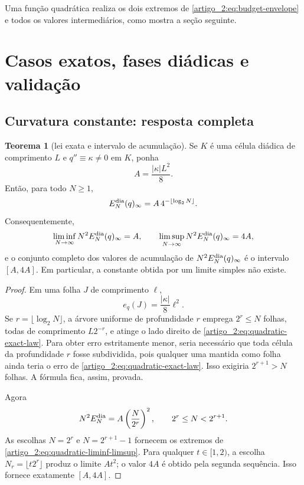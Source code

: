 \documentclass[12pt,a4paper]{article}
\theoremstyle{preciso}
\theoremstyle{definition}
\theoremstyle{preciso}
\newtheorem{theorem}[teorema]{Teorema}
\theoremstyle{preciso}
\theoremstyle{preciso}
\theoremstyle{preciso}
\theoremstyle{definition}
\theoremstyle{preciso}
\theoremstyle{definition}
\theoremstyle{preciso}
\theoremstyle{preciso}
\theoremstyle{definition}
\begin{document}
Uma função quadrática realiza os dois extremos de \eqref{artigo_2:eq:budget-envelope} e todos os valores intermediários, como mostra a seção seguinte.

\section{Casos exatos, fases diádicas e validação}
\label{artigo_2:sec:dyadic-exact-cases}

\subsection{Curvatura constante: resposta completa}

\begin{theorem}[lei exata e intervalo de acumulação]\label{map:artigo_2:12.1}
\label{artigo_2:thm:quadratic-dyadic-constant}
Se $K$ é uma célula diádica de comprimento $L$ e
$q''\equiv\kappa\ne0$ em $K$, ponha
\begin{equation}
 A=\frac{|\kappa|L^2}{8}.
 \label{artigo_2:eq:quadratic-A}
\end{equation}
Então, para todo $N\ge1$,
\begin{equation}
 E_N^{\rm dia}(q)_\infty
 =A\,4^{-\lfloor\log_2N\rfloor}.
 \label{artigo_2:eq:quadratic-exact-law}
\end{equation}
Consequentemente,
\begin{equation}
 \liminf_{N\to\infty}N^2E_N^{\rm dia}(q)_\infty=A,
 \qquad
 \limsup_{N\to\infty}N^2E_N^{\rm dia}(q)_\infty=4A,
 \label{artigo_2:eq:quadratic-liminf-limsup}
\end{equation}
e o conjunto completo dos valores de acumulação de
$N^2E_N^{\rm dia}(q)_\infty$ é o intervalo $[A,4A]$. Em particular, a
constante obtida por um limite simples não existe.
\end{theorem}

\begin{proof}
Em uma folha $J$ de comprimento $\ell$,
\begin{equation}
 e_q(J)=\frac{|\kappa|}{8}\ell^2.
 \label{artigo_2:eq:quadratic-local-exact}
\end{equation}
Se $r=\lfloor\log_2N\rfloor$, a árvore uniforme de profundidade $r$ emprega
$2^r\le N$ folhas, todas de comprimento $L2^{-r}$, e atinge o lado direito
de \eqref{artigo_2:eq:quadratic-exact-law}. Para obter erro estritamente menor, seria
necessário que toda célula da profundidade $r$ fosse subdividida, pois
qualquer uma mantida como folha ainda teria o erro de
\eqref{artigo_2:eq:quadratic-exact-law}. Isso exigiria $2^{r+1}>N$ folhas. A fórmula
fica, assim, provada.

Agora
\[
 N^2E_N^{\rm dia}=A\left(\frac{N}{2^r}\right)^2,
 \qquad 2^r\le N<2^{r+1}.
\]
As escolhas $N=2^r$ e $N=2^{r+1}-1$ fornecem os extremos de
\eqref{artigo_2:eq:quadratic-liminf-limsup}. Para qualquer $t\in[1,2)$, a escolha
$N_r=\lfloor t2^r\rfloor$ produz o limite $At^2$; o valor $4A$ é obtido
pela segunda sequência. Isso fornece exatamente $[A,4A]$.
\end{proof}
\end{document}
